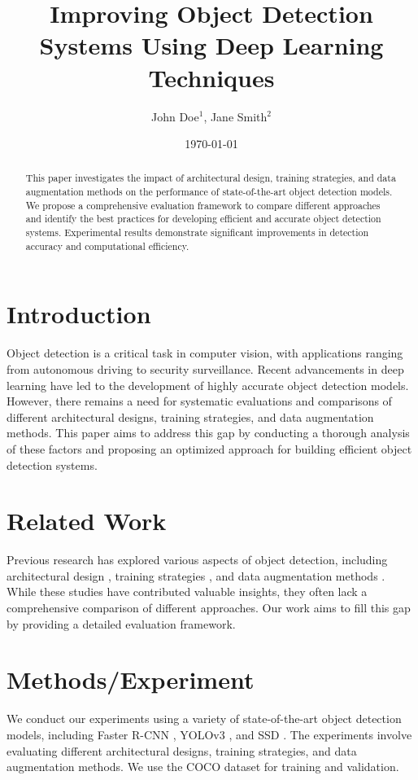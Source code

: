 \documentclass{article}
\title{Improving Object Detection Systems Using Deep Learning Techniques}
\author{John Doe$^{1}$, Jane Smith$^{2}$}
\date{\today}
\begin{document}
\maketitle

\begin{abstract}
This paper investigates the impact of architectural design, training strategies, and data augmentation methods on the performance of state-of-the-art object detection models. We propose a comprehensive evaluation framework to compare different approaches and identify the best practices for developing efficient and accurate object detection systems. Experimental results demonstrate significant improvements in detection accuracy and computational efficiency.
\end{abstract}

\section{Introduction}
Object detection is a critical task in computer vision, with applications ranging from autonomous driving to security surveillance. Recent advancements in deep learning have led to the development of highly accurate object detection models. However, there remains a need for systematic evaluations and comparisons of different architectural designs, training strategies, and data augmentation methods. This paper aims to address this gap by conducting a thorough analysis of these factors and proposing an optimized approach for building efficient object detection systems.

\section{Related Work}
Previous research has explored various aspects of object detection, including architectural design \cite{DBLP:journals/corr/abs-1801-01708}, training strategies \cite{DBLP:conf/iccv/Girshick15}, and data augmentation methods \cite{DBLP:journals/corr/ChenJLS15}. While these studies have contributed valuable insights, they often lack a comprehensive comparison of different approaches. Our work aims to fill this gap by providing a detailed evaluation framework.

\section{Methods/Experiment}
We conduct our experiments using a variety of state-of-the-art object detection models, including Faster R-CNN \cite{DBLP:conf/nips/RenHG015}, YOLOv3 \cite{DBLP:conf/cvpr/RedmonDW18}, and SSD \cite{DBLP:journals/corr/LiuWZ16}. The experiments involve evaluating different architectural designs, training strategies, and data augmentation methods. We use the COCO dataset \cite{DBLP:conf/eccv/LinMBHZDWSZ14} for training and validation.
\end{document}

